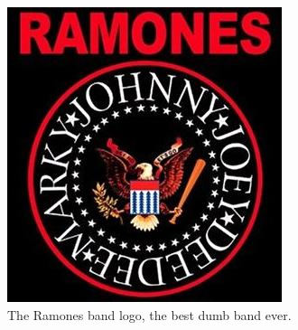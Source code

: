 \begin{figure}[ht]
  \centering
  \includegraphics[width=.5\textwidth]{figures/logo.jpg}
  \caption{The Ramones band logo, the best dumb band ever.}
  \label{fig:logo}
\end{figure}
